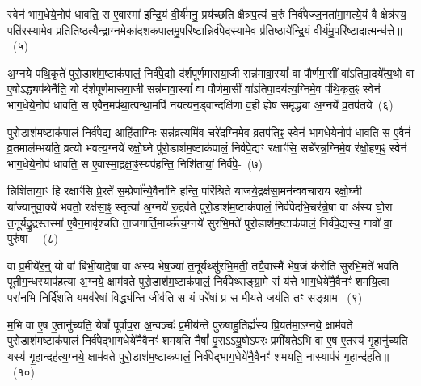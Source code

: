 स्वेन॑ भाग॒धेये॒नोप॑ धावति॒ स ए॒वास्मा॑ इन्द्रि॒यं वी॒र्य॑मनु॒ प्रय॑च्छति क्षैत्रप॒त्यं च॒रुं निर्व॑पेज्ज॒नता॑मा॒गत्ये॒यं वै क्षेत्र॑स्य॒ पति॑र॒स्यामे॒व प्रति॑तिष्ठत्यैन्द्रा॒ग्नमेका॑\-दश\-कपालमु॒परि॑ष्टा॒\-न्निर्व॑पेद॒स्यामे॒व प्र॑ति॒ष्ठाये᳚न्द्रि॒यं वी॒र्य॑मु॒परि॑ष्टादा॒त्मन्ध॑त्ते॥~(५)\ip

{\anuvakamend[{प्र॒जाका॑म इन्द्रा॒ग्नी उ॑पप्र॒यात्यै᳚न्द्रा॒ग्नमेका॑\-दश\-कपालं॒ निर्वी॒र्यं॑ पू॒षण॑मे॒वैका॒न्नच॑त्वारि॒ꣳ॒शच्च॑}]}

अ॒ग्नये॑ पथि॒कृते॑ पुरो॒डाश॑\-म॒ष्टा\-क॑पालं॒ निर्व॑पे॒द्यो द॑र्\mbox{}शपूर्णमास\-या॒जी सन्न॑मावा॒स्यां᳚ वा पौर्णमा॒सीं वा॑\-ऽतिपा॒दये᳚त्प॒थो वा ए॒षो\-ऽद्ध्यप॑थेनैति॒ यो द॑र्\mbox{}शपूर्णमासया॒जी सन्न॑मावा॒स्यां᳚ वा पौर्णमा॒सीं वा॑\-ऽतिपा॒दय॑त्य॒ग्निमे॒व प॑थि॒कृत॒ꣴ॒ स्वेन॑ भाग॒धेये॒नोप॑ धावति॒ स ए॒वैन॒मप॑था॒त्पन्था॒मपि॑ नयत्यन॒ड्वान्दक्षि॑णा व॒ही ह्ये॑ष समृ॑द्ध्या अ॒ग्नये᳚ व्र॒तप॑तये~(६)\ip

पुरो॒डाश॑\-म॒ष्टा\-क॑पालं॒ निर्व॑पे॒द्य आहि॑ताग्निः॒ सन्न॑व्र॒त्यमि॑व॒ चरे॑द॒ग्निमे॒व व्र॒तप॑ति॒ꣴ॒ स्वेन॑ भाग॒धेये॒नोप॑ धावति॒ स ए॒वैनं॑ व्र॒तमाल॑म्भयति॒ व्रत्यो॑ भवत्य॒ग्नये॑ रक्षो॒घ्ने पु॑रो॒डाश॑म॒ष्टा\-क॑पालं॒ निर्व॑पे॒द्यꣳ रक्षाꣳ॑सि॒ सचे॑रन्न॒ग्निमे॒व र॑क्षो॒हण॒ꣴ॒ स्वेन॑ भाग॒धेये॒नोप॑ धावति॒ स ए॒वास्मा॒द्रक्षा॒ꣴ॒स्यप॑\-हन्ति॒ निशि॑तायां॒ निर्व॑पे॒-~(७)\ip

न्निशि॑ताया॒ꣳ॒ हि रक्षाꣳ॑सि प्रे॒रते॑ स॒म्प्रेर्णा᳚न्ये॒वैना॑नि हन्ति॒ परि॑श्रिते याजये॒द्रक्ष॑सा॒\-मन॑न्वव\-चाराय रक्षो॒घ्नी या᳚ज्यानुवा॒क्ये॑ भवतो॒ रक्ष॑सा॒ꣴ॒ स्तृत्या॑ अ॒ग्नये॑ रु॒द्रव॑ते पुरो॒डाश॑\-म॒ष्टा\-क॑पालं॒ निर्व॑पेदभि॒चर॑न्ने॒षा वा अ॑स्य घो॒रा त॒नूर्यद्रु॒द्रस्तस्मा॑ ए॒वैन॒मावृ॑श्चति ता॒जगार्ति॒मार्च्छ॑त्य॒ग्नये॑ सुरभि॒मते॑ पुरो॒डाश॑\-म॒ष्टा\-क॑पालं॒ निर्व॑पे॒द्यस्य॒ गावो॑ वा॒ पुरु॑षा~-~(८)\ip

वा प्र॒मीये॑र॒न्॒ यो वा॑ बिभी॒यादे॒षा वा अ॑स्य भेष॒ज्या॑ त॒नूर्यथ्सु॑रभि॒मती॒ तयै॒वास्मै॑ भेष॒जं क॑रोति सुरभि॒मते॑ भवति पूतीग॒न्धस्याप॑हत्या अ॒ग्नये॒ क्षाम॑वते पुरो॒डाश॑\-म॒ष्टा\-क॑पालं॒ निर्व॑पेथ्सङ्ग्रा॒मे सं य॑त्ते भाग॒धेये॑नै॒वैनꣳ॑ शमयि॒त्वा परा॑न॒भि निर्दि॑शति॒ यमव॑रेषां॒ विद्ध्य॑न्ति॒ जीव॑ति॒ स यं परे॑षां॒ प्र स मी॑यते॒ जय॑ति॒ तꣳ स॑ङ्ग्रा॒म-~(९)\ip

म॒भि वा ए॒ष ए॒तानु॑च्यति॒ येषां᳚ पूर्वाप॒रा अ॒न्वञ्चः॑ प्र॒मीय॑न्ते पुरुषाहु॒तिर्ह्य॑स्य प्रि॒यत॑मा॒\-ऽग्नये॒ क्षाम॑वते पुरो॒डाश॑\-म॒ष्टा\-क॑पालं॒ निर्व॑पेद्भाग॒धेये॑नै॒वैनꣳ॑ शमयति॒ नैषां᳚ पु॒रा\-ऽऽ\-यु॒षो\-ऽप॑रः॒ प्रमी॑यते॒\-ऽभि वा ए॒ष ए॒तस्य॑ गृ॒हानु॑च्यति॒ यस्य॑ गृ॒हान्दह॑त्य॒ग्नये॒ क्षाम॑वते पुरो॒डाश॑\-म॒ष्टा\-क॑पालं॒ निर्व॑पेद्भाग॒धेये॑नै॒वैनꣳ॑ शमयति॒ नास्याप॑रं गृ॒हान्द॑हति॥~(१०)\ip

